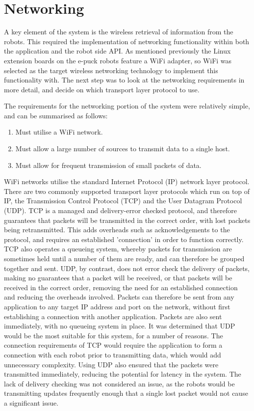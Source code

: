 
\section{Networking} \label{Networking}
A key element of the system is the wireless retrieval of information from the robots. This required the implementation of networking functionality within both the application and the robot side API. As mentioned previously the Linux extension boards on the e-puck robots feature a WiFi adapter, so WiFi was selected as the target wireless networking technology to implement this functionality with. The next step was to look at the networking requirements in more detail, and decide on which transport layer protocol to use.

The requirements for the networking portion of the system were relatively simple, and can be summarised as follows:

\begin{enumerate}
	\item Must utilise a WiFi network.
	\item Must allow a large number of sources to transmit data to a single host.
	\item Must allow for frequent transmission of small packets of data.
\end{enumerate}

WiFi networks utilise the standard Internet Protocol (IP) network layer protocol. There are two commonly supported transport layer protocols which run on top of IP, the Transmission Control Protocol (TCP) and the User Datagram Protocol (UDP). TCP is a managed and delivery-error checked protocol, and therefore guarantees that packets will be transmitted in the correct order, with lost packets being retransmitted. This adds overheads such as acknowledgements to the protocol, and requires an established 'connection' in order to function correctly. TCP also operates a queueing system, whereby packets for transmission are sometimes held until a number of them are ready, and can therefore be grouped together and sent. UDP, by contrast, does not error check the delivery of packets, making no guarantees that a packet will be received, or that packets will be received in the correct order, removing the need for an established connection and reducing the overheads involved. Packets can therefore be sent from any application to any target IP address and port on the network, without first establishing a connection with another application. Packets are also sent immediately, with no queueing system in place. It was determined that UDP would be the most suitable for this system, for a number of reasons. The connection requirements of TCP would require the application to form a connection with each robot prior to transmitting data, which would add unnecessary complexity. Using UDP also ensured that the packets were transmitted immediately, reducing the potential for latency in the system. The lack of delivery checking was not considered an issue, as the robots would be transmitting updates frequently enough that a single lost packet would not cause a significant issue.

